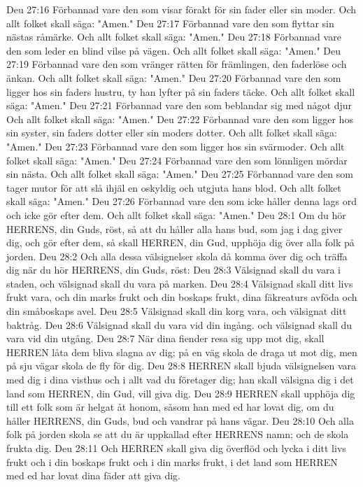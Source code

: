 Deu 27:16  Förbannad vare den som visar förakt för sin fader eller sin moder. Och allt folket skall säga: "Amen."
Deu 27:17  Förbannad vare den som flyttar sin nästas råmärke. Och allt folket skall säga: "Amen."
Deu 27:18  Förbannad vare den som leder en blind vilse på vägen. Och allt folket skall säga: "Amen."
Deu 27:19  Förbannad vare den som vränger rätten för främlingen, den faderlöse och änkan. Och allt folket skall säga: "Amen."
Deu 27:20  Förbannad vare den som ligger hos sin faders hustru, ty han lyfter på sin faders täcke. Och allt folket skall säga: "Amen."
Deu 27:21  Förbannad vare den som beblandar sig med något djur Och allt folket skall säga: "Amen."
Deu 27:22  Förbannad vare den som ligger hos sin syster, sin faders dotter eller sin moders dotter. Och allt folket skall säga: "Amen."
Deu 27:23  Förbannad vare den som ligger hos sin svärmoder. Och allt folket skall säga: "Amen."
Deu 27:24  Förbannad vare den som lönnligen mördar sin nästa. Och allt folket skall säga: "Amen."
Deu 27:25  Förbannad vare den som tager mutor för att slå ihjäl en oskyldig och utgjuta hans blod. Och allt folket skall säga: "Amen."
Deu 27:26  Förbannad vare den som icke håller denna lags ord och icke gör efter dem. Och allt folket skall säga: "Amen."
Deu 28:1  Om du hör HERRENS, din Guds, röst, så att du håller alla hans bud, som jag i dag giver dig, och gör efter dem, så skall HERREN, din Gud, upphöja dig över alla folk på jorden.
Deu 28:2  Och alla dessa välsignelser skola då komma över dig och träffa dig när du hör HERRENS, din Guds, röst:
Deu 28:3  Välsignad skall du vara i staden, och välsignad skall du vara på marken.
Deu 28:4  Välsignad skall ditt livs frukt vara, och din marks frukt och din boskaps frukt, dina fäkreaturs avföda och din småboskaps avel.
Deu 28:5  Välsignad skall din korg vara, och välsignat ditt baktråg.
Deu 28:6  Välsignad skall du vara vid din ingång. och välsignad skall du vara vid din utgång.
Deu 28:7  När dina fiender resa sig upp mot dig, skall HERREN låta dem bliva slagna av dig; på en väg skola de draga ut mot dig, men på sju vägar skola de fly för dig.
Deu 28:8  HERREN skall bjuda välsignelsen vara med dig i dina visthus och i allt vad du företager dig; han skall välsigna dig i det land som HERREN, din Gud, vill giva dig.
Deu 28:9  HERREN skall upphöja dig till ett folk som är helgat åt honom, såsom han med ed har lovat dig, om du håller HERRENS, din Guds, bud och vandrar på hans vägar.
Deu 28:10  Och alla folk på jorden skola se att du är uppkallad efter HERRENS namn; och de skola frukta dig.
Deu 28:11  Och HERREN skall giva dig överflöd och lycka i ditt livs frukt och i din boskaps frukt och i din marks frukt, i det land som HERREN med ed har lovat dina fäder att giva dig.

